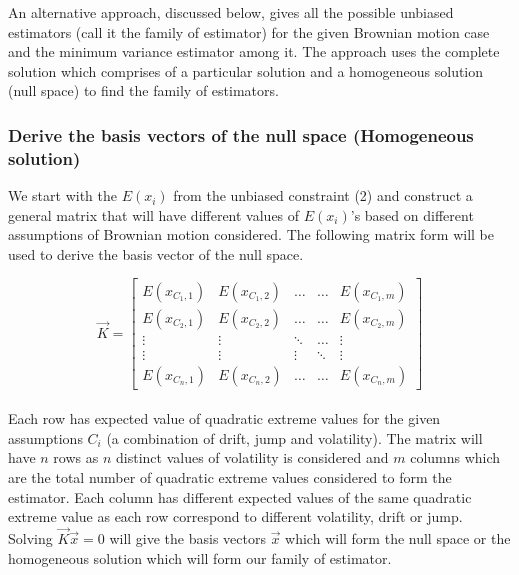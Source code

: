 \documentclass[12pt]{article}   	%
\begin{document}
An alternative approach, discussed below, gives all the possible unbiased estimators (call it the family of estimator) for the given Brownian motion case and the minimum variance estimator among it. The approach uses the complete solution which comprises of a particular solution and a homogeneous solution (null space) to find the family of estimators. 

\subsubsection{	Derive the basis vectors of the null space (Homogeneous solution)}
We start with the $E(x_i)$ from the unbiased constraint (2) and construct a general matrix that will have different values of 
$E(x_i)$'s based on different assumptions of Brownian motion considered. The following matrix form will be used to derive the basis vector of the null space.

\begin{equation}
	\vec{K}= 
	\begin{bmatrix}
	E(x_{C_1,1})&E(x_{C_1,2})&\dots&\dots&E(x_{C_1,m})\\
	E(x_{C_2,1})& E(x_{C_2,2})&\dots&\dots&E(x_{C_2,m})\\
	\vdots&\vdots&\ddots&\dots&\vdots\\
	\vdots&\vdots&\vdots&\ddots&\vdots\\
	E(x_{C_n,1})&E(x_{C_n,2})&\dots&\dots&E(x_{C_n,m})
	\end{bmatrix}
\end{equation}
\\

Each row has expected value of quadratic extreme values for the given assumptions $C_i$ (a combination of drift, jump and volatility). The matrix will have  $n$ rows as $n$ distinct values of volatility is considered and $m$ columns which are the total number of quadratic extreme values considered to form the estimator. Each column has different expected values of the same quadratic extreme value as each row correspond to different volatility, drift or jump. Solving $\vec{K}\vec{x}=0$ will give the basis vectors $\vec{ x}$ which will form the null space or the homogeneous solution which will form our family of estimator.
 
\end{document}
